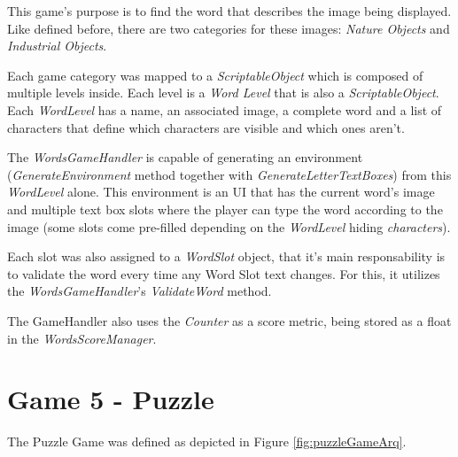 This game's purpose is to find the word that describes the image being displayed. Like defined before, there are two categories for these images: \textit{Nature Objects} and \textit{Industrial Objects}.

Each game category was mapped to a \textit{ScriptableObject} which is composed of multiple levels inside. Each level is a \textit{Word Level} that is also a \textit{ScriptableObject}. Each \textit{WordLevel} has a name, an associated image, a complete word and a list of characters that define which characters are visible and which ones aren't.

The \textit{WordsGameHandler} is capable of generating an environment (\textit{GenerateEnvironment} method together with \textit{GenerateLetterTextBoxes}) from this \textit{WordLevel} alone. This environment is an UI that has the current word's image and multiple text box slots where the player can type the word according to the image (some slots come pre-filled depending on the \textit{WordLevel} hiding \textit{characters}).

Each slot was also assigned to a \textit{WordSlot} object, that it's main responsability is to validate the word every time any Word Slot text changes. For this, it utilizes the \textit{WordsGameHandler}'s \textit{ValidateWord} method.

The GameHandler also uses the \textit{Counter} as a score metric, being stored as a float in the \textit{WordsScoreManager}.

\section{Game 5 - Puzzle}
\label{arqPuzzle}

The Puzzle Game was defined as depicted in Figure \ref{fig:puzzleGameArq}.

